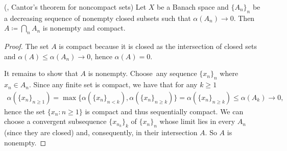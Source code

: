 \begin{theorem}\label{thm:noncompact_cantor_theorem}(\cite[exercise 7.4]{Deimling1985}, Cantor's theorem for noncompact sets)
  Let $X$ be a Banach space and $\{ A_n \}_n$ be a decreasing sequence of nonempty closed subsets such that $\alpha(A_n) \to 0$. Then $A \coloneqq \bigcap_n A_n$ is nonempty and compact.
\end{theorem}
\begin{proof}
  The set $A$ is compact because it is closed as the intersection of closed sets and $\alpha(A) \leq \alpha(A_n) \to 0$, hence $\alpha(A) = 0$.

  It remains to show that $A$ is nonempty.
  Choose\AOC\ any sequence $\{ x_n \}_n$ where $x_n \in A_n$. Since any finite set is compact, we have that for any $k \geq 1$
  \begin{align*}
    \alpha(\{ x_n \}_{n \geq 1})
    =
    \max\{ \alpha(\{ x_n \}_{n < k}), \alpha(\{ x_n \}_{n \geq k}) \}
    =
    \alpha(\{ x_n \}_{n \geq k})
    \leq
    \alpha(A_k) \to 0,
  \end{align*}
  hence the set $\{ x_n \colon n \geq 1 \}$ is compact and thus sequentially compact. We can choose a convergent subsequence $\{ x_{n_k} \}_k$ of $\{ x_n \}_n$ whose limit lies in every $A_n$ (since they are closed) and, consequently, in their intersection $A$. So $A$ is nonempty.
\end{proof}

